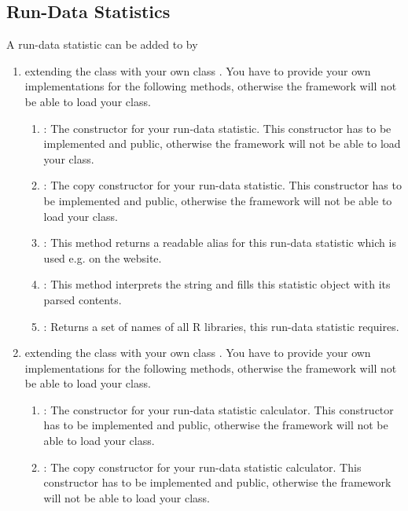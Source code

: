	\subsection{Run-Data Statistics}\label{subsec_extend_rundatastats}
	A run-data statistic  can be added to \clusteval by
	\begin{enumerate}
		\item extending the class  with your own class . You have to provide your own implementations for the following methods, otherwise the framework will not be able to load your class.
		\begin{enumerate}
			\item {}: The constructor for your run-data statistic. This constructor has to be implemented and public, otherwise the framework will not be able to load your class.
			\item {}: The copy constructor for your run-data statistic. This constructor has to be implemented and public, otherwise the framework will not be able to load your class.
			\item {}: This method returns a readable alias for this run-data statistic which is used e.g. on the website.
			\item {}: This method interprets the string and fills this statistic object with its parsed contents.
			\item {}: Returns a set of names of all R libraries, this run-data statistic requires.
		\end{enumerate}
		\item extending the class  with your own class . You have to provide your own implementations for the following methods, otherwise the framework will not be able to load your class.
		\begin{enumerate}
			\item {}: The constructor for your run-data statistic calculator. This constructor has to be implemented and public, otherwise the framework will not be able to load your class.
			\item {}: The copy constructor for your run-data statistic calculator. This constructor has to be implemented and public, otherwise the framework will not be able to load your class.

\end{enumerate}
\end{enumerate}
